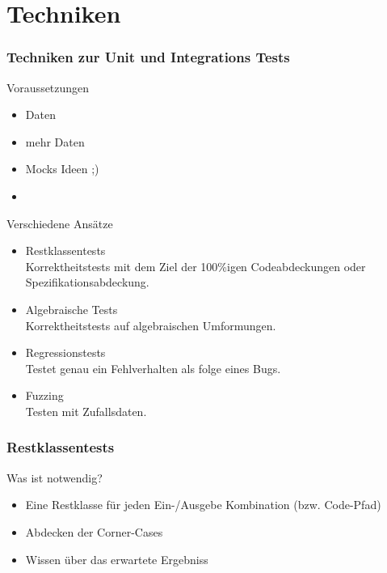 \section{Techniken}
\begin{frame}
  \frametitle{Techniken zur Unit und Integrations Tests}

  \pause
  \begin{block}{Voraussetzungen}
    \pause
    \begin{itemize}
      \item Daten
        \pause 
      \item mehr Daten
        \pause
      \item Mocks
        \pause Ideen ;)
      \item 
    \end{itemize}
  \end{block}
  \pause

  \begin{block}{Verschiedene Ansätze}
    \begin{itemize}
      \item Restklassentests\\
        Korrektheitstests mit dem Ziel der 100\%igen Codeabdeckungen oder Spezifikationsabdeckung.
        \pause
      \item Algebraische Tests\\
        Korrektheitstests auf algebraischen Umformungen.
        \pause
      \item Regressionstests\\
        Testet genau ein Fehlverhalten als folge eines Bugs.
        \pause
     \item Fuzzing\\
       Testen mit Zufallsdaten.
    \end{itemize}
  \end{block}
\end{frame}

\begin{frame}
  \frametitle{Restklassentests}
  \begin{block}{Was ist notwendig?}
    \begin{itemize}
      \item Eine Restklasse für jeden Ein-/Ausgebe Kombination (bzw. Code-Pfad)
        \pause
      \item Abdecken der Corner-Cases
        \pause
      \item Wissen über das erwartete Ergebniss
        \pause
    \end{itemize}
  \end{block}
\end{frame}


